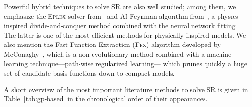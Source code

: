 \documentclass[a4paper,12pt]{elsarticle}
\begin{document}
    Powerful hybrid techniques to solve SR are also well studied; among them, we emphasize the \textsc{Eplex} solver from~\cite{la2019probabilistic,la2016epsilon} and AI Feynman algorithm from~\cite{udrescu2020ai}, a physics-inspired divide-and-conquer method combined with the neural network fitting. The latter is one of the most efficient methods for physically inspired models. We also mention the Fast Function Extraction (\textsc{Ffx}) algorithm developed by McConaghy~\cite{mcconaghy2011ffx},  which is a non-evolutionary method   combined with a machine learning technique---path-wise regularized learning--- which prunes quickly a huge set of candidate basis functions down to compact models.
	
	A short overview of the most important literature methods to solve SR is given in Table~\ref{tab:gp-based} in the chronological order of their appearances.  
	
\end{document}
